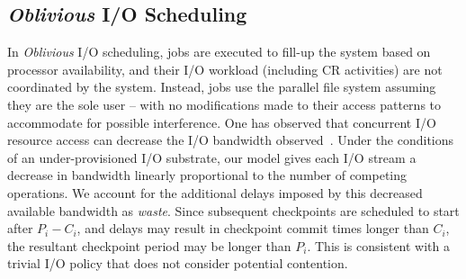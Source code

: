 \documentclass[conference,nofonttune]{IEEEtran}
\newcommand{\period}[1]{P_{#1}}
\newcommand{\ckpt}[1]{C_{#1}}
\newcommand{\dca}[1]{\todo[inline]{DCA: #1}}
\newcommand{\nocoop}{\emph{Oblivious}\xspace}
\def\propfixed{\nocoop-Fixed\xspace}
\def\propdaly{\nocoop-Daly\xspace}
\begin{document}


\subsection{\nocoop I/O Scheduling}

In \nocoop I/O scheduling, jobs are executed to fill-up the system based on
processor availability, and their I/O workload (including CR activities) are
not coordinated by the system.  Instead, jobs use the parallel file system
assuming they are the sole user -- with no modifications made to their access
patterns to accommodate for possible interference. One has observed
that concurrent I/O resource access can decrease the I/O bandwidth
observed~\cite{Dorier2015}.  Under the conditions of an under-provisioned I/O
substrate, our model gives each I/O stream a decrease in bandwidth linearly
proportional to the number of competing operations.  We account for the
additional delays imposed by this decreased available bandwidth as
\emph{waste}.  Since subsequent checkpoints are scheduled to start after
$\period{i}-\ckpt{i}$, and delays may result in checkpoint commit times longer
than $\ckpt{i}$, the resultant checkpoint period may be longer than
$\period{i}$. This is consistent with a trivial I/O policy that does not
consider potential contention.

\end{document}
